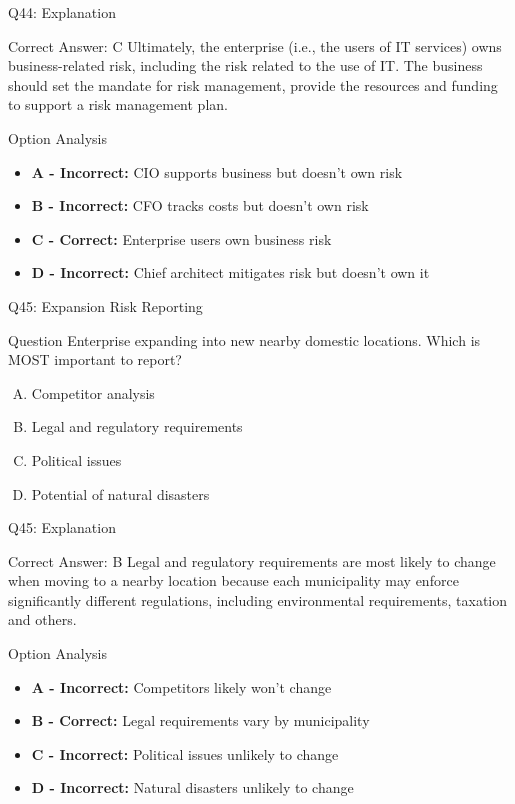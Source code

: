 \documentclass{beamer}
\begin{document}
	\begin{frame}{Q44: Explanation}
		\begin{block}{Correct Answer: C}
			Ultimately, the enterprise (i.e., the users of IT services) owns business-related risk, including the risk related to the use of IT. The business should set the mandate for risk management, provide the resources and funding to support a risk management plan.
		\end{block}
		\begin{block}{Option Analysis}
			\begin{itemize}
				\item \textbf{A - Incorrect:} CIO supports business but doesn't own risk
				\item \textbf{B - Incorrect:} CFO tracks costs but doesn't own risk
				\item \textbf{C - Correct:} Enterprise users own business risk
				\item \textbf{D - Incorrect:} Chief architect mitigates risk but doesn't own it
			\end{itemize}
		\end{block}
	\end{frame}
	
	\begin{frame}{Q45: Expansion Risk Reporting}
		\begin{block}{Question}
			Enterprise expanding into new nearby domestic locations. Which is MOST important to report?
		\end{block}
		\begin{enumerate}[(A)]
			\item Competitor analysis
			\item Legal and regulatory requirements
			\item Political issues
			\item Potential of natural disasters
		\end{enumerate}
	\end{frame}
	
	\begin{frame}{Q45: Explanation}
		\begin{block}{Correct Answer: B}
			Legal and regulatory requirements are most likely to change when moving to a nearby location because each municipality may enforce significantly different regulations, including environmental requirements, taxation and others.
		\end{block}
		\begin{block}{Option Analysis}
			\begin{itemize}
				\item \textbf{A - Incorrect:} Competitors likely won't change
				\item \textbf{B - Correct:} Legal requirements vary by municipality
				\item \textbf{C - Incorrect:} Political issues unlikely to change
				\item \textbf{D - Incorrect:} Natural disasters unlikely to change
			\end{itemize}
		\end{block}
	\end{frame}
	
\end{document}

